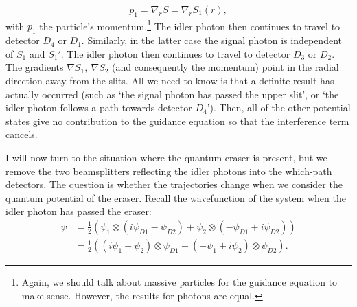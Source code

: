 \documentclass[11pt]{article}
\numberwithin{equation}{section}
\begin{document}
\begin{equation}
p_1=\nabla_{r}S= \nabla_{r}S_1(r),
\end{equation} with $p_1$ the particle's momentum.\footnote{Again, we should talk about massive particles for the guidance equation to make sense. However, the results for photons are equal.} The idler photon then continues to travel to detector $D_4$ or $D_1$. Similarly, in the latter case the signal photon is independent of $S_1$ and $S_1'$. The idler photon then continues to travel to detector $D_3$ or $D_2$. The gradients $\nabla S_1, \ \nabla S_2$ (and consequently the momentum) point in the radial direction away from the slits. All we need to know is that a definite result has actually occurred (such as `the signal photon has passed the upper slit', or `the idler photon follows a path towards detector $D_4$'). Then, all of the other potential states give no contribution to the guidance equation so that the interference term cancels.

I will now turn to the situation where the quantum eraser is present, but we remove the two beamsplitters reflecting the idler photons into the which-path detectors. The question is whether the trajectories change when we consider the quantum potential of the eraser.
Recall the wavefunction of the system when the idler photon has passed the eraser:
\begin{align}
\label{eraser}
\psi &= \frac{1}{2}(\psi_1\otimes (i\psi_{D1}-\psi_{D2})+\psi_2\otimes (-\psi_{D1}+i\psi_{D2})) \nonumber \\
&= \frac{1}{2}((i\psi_{1}-\psi_{2})\otimes\psi_{D1} + (-\psi_{1}+i\psi_{2})\otimes\psi_{D2}).
\end{align}
\end{document}
